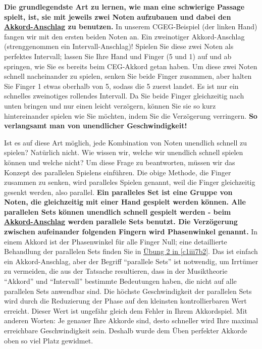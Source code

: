 \textbf{Die grundlegendste Art zu lernen, wie man eine schwierige Passage spielt, ist, sie mit jeweils zwei Noten aufzubauen und dabei den \hyperref[c1ii9]{Akkord-Anschlag} zu benutzen.} In unserem CGEG-Beispiel (der linken Hand) fangen wir mit den ersten beiden Noten an.
Ein zweinotiger Akkord-Anschlag (strenggenommen ein Intervall-Anschlag)!
Spielen Sie diese zwei Noten als perfektes Intervall; lassen Sie Ihre Hand und Finger (5 und 1) auf und ab springen, wie Sie es bereits beim CEG-Akkord getan haben.
Um diese zwei Noten schnell nacheinander zu spielen, senken Sie beide Finger zusammen, aber halten Sie Finger 1 etwas oberhalb von 5, sodass die 5 zuerst landet.
Es ist nur ein schnelles zweinotiges rollendes Intervall.
Da Sie beide Finger gleichzeitig nach unten bringen und nur einen leicht verzögern, können Sie sie so kurz hintereinander spielen wie Sie möchten, indem Sie die Verzögerung verringern.
\textbf{So verlangsamt man von unendlicher Geschwindigkeit!}

Ist es auf diese Art möglich, jede Kombination von Noten unendlich schnell zu spielen? Natürlich nicht.
Wie wissen wir, welche wir unendlich schnell spielen können und welche nicht?
Um diese Frage zu beantworten, müssen wir das Konzept des parallelen Spielens einführen.
Die obige Methode, die Finger zusammen zu senken, wird paralleles Spielen genannt, weil die Finger gleichzeitig gesenkt werden, also parallel.
\textbf{Ein paralleles Set ist eine Gruppe von Noten, die gleichzeitig mit einer Hand gespielt werden können.
Alle parallelen Sets können unendlich schnell gespielt werden - beim \hyperref[c1ii9]{Akkord-Anschlag} werden parallele Sets benutzt.
Die Verzögerung zwischen aufeinander folgenden Fingern wird Phasenwinkel genannt.}
In einem Akkord ist der Phasenwinkel für alle Finger Null; eine detaillierte Behandlung der parallelen Sets finden Sie in \hyperref[c1iii7b2]{Übung 2 in \ref*{c1iii7b2}}.
Das ist einfach ein Akkord-Anschlag, aber der Begriff \enquote{parallele Sets} ist notwendig, um Irrtümer zu vermeiden, die aus der Tatsache resultieren, dass in der Musiktheorie \enquote{Akkord} und \enquote{Intervall} bestimmte Bedeutungen haben, die nicht auf alle parallelen Sets anwendbar sind.
Die höchste Geschwindigkeit der parallelen Sets wird durch die Reduzierung der Phase auf den kleinsten kontrollierbaren Wert erreicht.
Dieser Wert ist ungefähr gleich dem Fehler in Ihrem Akkordspiel.
Mit anderen Worten: Je genauer Ihre Akkorde sind, desto schneller wird Ihre maximal erreichbare Geschwindigkeit sein.
Deshalb wurde dem Üben perfekter Akkorde oben so viel Platz gewidmet.

